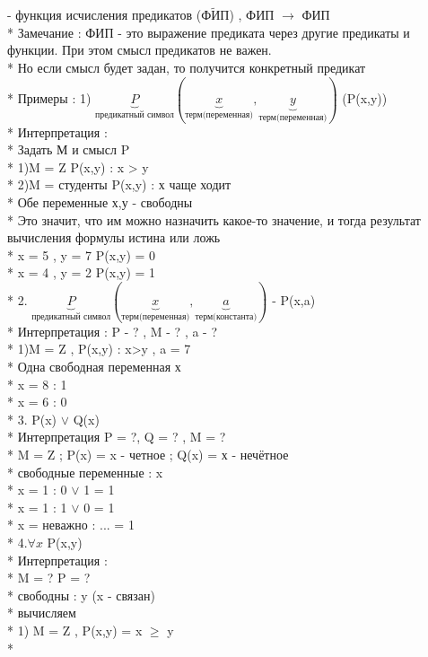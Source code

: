 \documentclass{article}
\begin{document}
- функция исчисления предикатов ($\widetilde{\mbox{ФИП}}$) , ФИП $\longrightarrow $ ФИП \\*
Замечание : ФИП - это выражение предиката через другие предикаты и функции. При этом смысл предикатов не важен. \\*
Но если смысл будет задан, то получится конкретный предикат \\*
Примеры : 
1) $\underbrace{P}_{\mbox{предикатный символ}} (\underbrace{x}_{\mbox{терм(переменная)}},\underbrace{y}_{\mbox{терм(переменная)}})$   (P(x,y)) \\*
Интерпретация : \\*
Задать М и смысл P \\*
1)M = Z P(x,y) : x > y \\*
2)M = студенты P(x,y) : х чаще ходит \\*
Обе переменные х,у - свободны \\*
Это значит, что им можно назначить какое-то значение, и тогда результат вычисления формулы истина или ложь \\*
x = 5 , y = 7 P(x,y) = 0  \\*
x = 4 , y = 2 P(x,y) = 1 \\*
2. $\underbrace{P}_{\mbox{предикатный символ}} (\underbrace{x}_{\mbox{терм(переменная)}},\underbrace{a}_{\mbox{терм(константа)}})$ - P(x,a) \\*
Интерпретация : P - ? , M - ? , a - ? \\*
1)M = Z , P(x,y) : x>y , a = 7 \\*
Одна свободная переменная х \\*
x = 8 : 1 \\*
x = 6 : 0 \\*
3. P(x) $\vee$ Q(x) \\*
Интерпретация P = ?, Q = ? , M = ? \\*
M = Z ; P(x) = x - четное ; Q(x) = х - нечётное \\*
свободные переменные : x \\*
x = 1 : 0 $\vee$ 1 = 1 \\*
x = 1 : 1 $\vee$ 0 = 1 \\*
x = неважно : ... = 1 \\*
4.$\forall x$ P(x,y) \\*
Интерпретация : \\*
M = ? P = ? \\*
свободны : y (x - связан) \\*
вычисляем \\*
1) M = Z , P(x,y) = x $\geq$ y \\*
\end{document}
